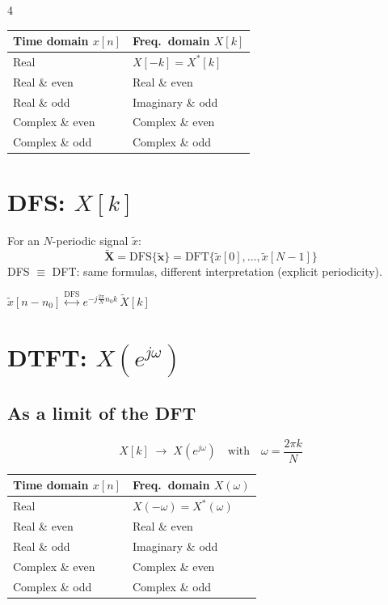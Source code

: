 \documentclass[8pt,a4paper,landscape]{extarticle}
\begin{document}
\begin{multicols*}{4}
\begin{thm}[title=Symmetry summary]
\renewcommand{\arraystretch}{1}
\begin{tabularx}{\linewidth}{@{}XX@{}}
\toprule
\textbf{Time domain} $x[n]$ & \textbf{Freq.\ domain} $X[k]$ \\
\midrule
Real & $X[-k]=X^*[k]$ \\
Real \& even & Real \& even \\
Real \& odd & Imaginary \& odd \\
Complex \& even & Complex \& even \\
Complex \& odd & Complex \& odd \\
\bottomrule
\end{tabularx}
\end{thm}

\section{DFS: $X[k]$}
\begin{defn}[title=DFS (Discrete Fourier Series)]
For an $N$-periodic signal $\tilde{x}$:
\[
  \tilde{\mathbf{X}} = \mathrm{DFS}\{\tilde{\mathbf{x}}\} = \mathrm{DFT}\{\tilde{x}[0],\ldots,\tilde{x}[N-1]\}
\]
DFS $\equiv$ DFT: same formulas, different interpretation (explicit periodicity).
\end{defn}

\begin{prop}[title=Circular shift]
$\tilde{x}[n-n_0] \overset{\mathrm{DFS}}{\longleftrightarrow} e^{-j\frac{2\pi}{N}n_0 k}\,\tilde{X}[k]$
\end{prop}

\section{DTFT: $X(e^{j\omega})$}

\subsection{As a limit of the DFT}
\[
  X[k] \;\longrightarrow\; X(e^{j\omega}) \quad \text{with} \quad \omega = \frac{2\pi k}{N}
\]

\begin{thm}[title=Symmetry summary]
\renewcommand{\arraystretch}{1}
\begin{tabularx}{\linewidth}{@{}XX@{}}
\toprule
\textbf{Time domain} $x[n]$ & \textbf{Freq.\ domain} $X(\omega)$ \\
\midrule
Real & $X(-\omega)=X^*(\omega)$ \\
Real \& even & Real \& even \\
Real \& odd & Imaginary \& odd \\
Complex \& even & Complex \& even \\
Complex \& odd & Complex \& odd \\
\bottomrule
\end{tabularx}
\end{thm}


\end{multicols*}
\end{document}
